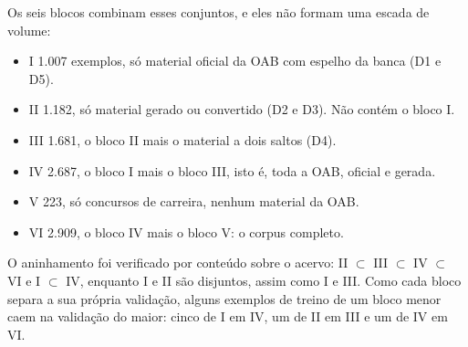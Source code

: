 \documentclass{IOS-Book-Article}
\begin{document}
Os seis blocos combinam esses conjuntos, e eles não formam uma escada de volume:
\begin{itemize}
\item I \textperiodcentered{} 1.007 exemplos, só material oficial da OAB com espelho da banca (D1 e D5).
\item II \textperiodcentered{} 1.182, só material gerado ou convertido (D2 e D3). Não contém o bloco I.
\item III \textperiodcentered{} 1.681, o bloco II mais o material a dois saltos (D4).
\item IV \textperiodcentered{} 2.687, o bloco I mais o bloco III, isto é, toda a OAB, oficial e gerada.
\item V \textperiodcentered{} 223, só concursos de carreira, nenhum material da OAB.
\item VI \textperiodcentered{} 2.909, o bloco IV mais o bloco V: o corpus completo.
\end{itemize}
O aninhamento foi verificado por conteúdo sobre o acervo: II $\subset$ III $\subset$ IV $\subset$ VI e I $\subset$ IV, enquanto I e II são disjuntos, assim como I e III. Como cada bloco separa a sua própria validação, alguns exemplos de treino de um bloco menor caem na validação do maior: cinco de I em IV, um de II em III e um de IV em VI.
\end{document}
